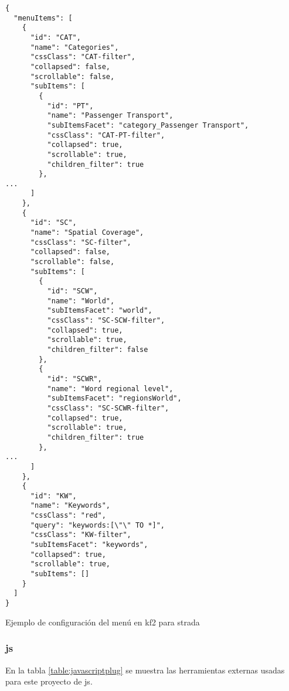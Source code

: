 \begin{listing}[H]
\begin{verbatim}
{
  "menuItems": [
    {
      "id": "CAT",
      "name": "Categories",
      "cssClass": "CAT-filter",
      "collapsed": false,
      "scrollable": false,
      "subItems": [
        {
          "id": "PT",
          "name": "Passenger Transport",
          "subItemsFacet": "category_Passenger Transport",
          "cssClass": "CAT-PT-filter",
          "collapsed": true,
          "scrollable": true,
          "children_filter": true
        },
...
      ]
    },
    {
      "id": "SC",
      "name": "Spatial Coverage",
      "cssClass": "SC-filter",
      "collapsed": false,
      "scrollable": false,
      "subItems": [
        {
          "id": "SCW",
          "name": "World",
          "subItemsFacet": "world",
          "cssClass": "SC-SCW-filter",
          "collapsed": true,
          "scrollable": true,
          "children_filter": false
        },
        {
          "id": "SCWR",
          "name": "Word regional level",
          "subItemsFacet": "regionsWorld",
          "cssClass": "SC-SCWR-filter",
          "collapsed": true,
          "scrollable": true,
          "children_filter": true
        },
...
      ]
    },
    {
      "id": "KW",
      "name": "Keywords",
      "cssClass": "red",
      "query": "keywords:[\"\" TO *]",
      "cssClass": "KW-filter",
      "subItemsFacet": "keywords",
      "collapsed": true,
      "scrollable": true,
      "subItems": []
    }
  ]
}
    \end{verbatim}
	\caption{Ejemplo de configuración del menú en \gls{kf2} para \gls{strada}}
	\label{code:categorias}
\end{listing}

\subsubsection{\gls{js}} 
En la tabla \ref{table:javascriptplug} se muestra las herramientas externas usadas para este proyecto de \gls{js}.

